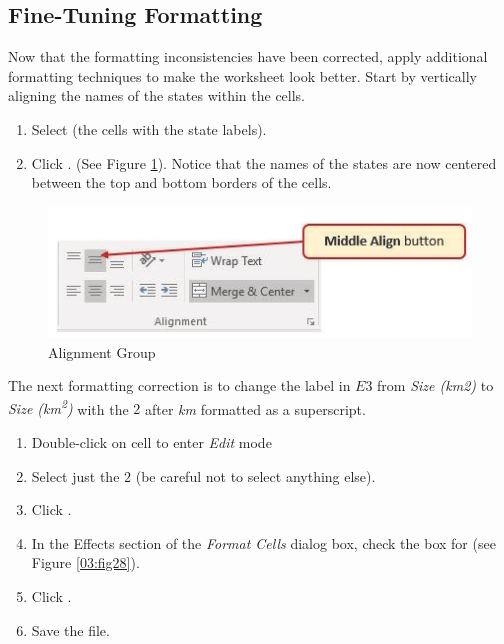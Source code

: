 \subsection{Fine-Tuning Formatting}

Now that the formatting inconsistencies have been corrected, apply additional formatting techniques to make the worksheet look better. Start by vertically aligning the names of the states within the cells.

\begin{enumerate}
	\item Select  (the cells with the state labels).
	\item Click . (See Figure \ref{03:fig27}). Notice that the names of the states are now centered between the top and bottom borders of the cells.
\end{enumerate}

\begin{figure}[H]
	\centering
	\includegraphics[width=\maxwidth{.95\linewidth}]{gfx/ch03_fig27}
	\caption{Alignment Group}
	\label{03:fig27}
\end{figure}

The next formatting correction is to change the label in $ E3 $ from \textit{Size (km2)} to \textit{Size (km\textsuperscript{2})} with the $ 2 $ after \textit{km} formatted as a superscript.

\begin{enumerate}
	\item Double-click on cell  to enter \textit{Edit} mode
	\item Select just the $ 2 $ (be careful not to select anything else).
	\item Click . 	
	\item In the Effects section of the \textit{Format Cells} dialog box, check the box for  (see Figure \ref{03:fig28}). 
	\item Click .
	\item Save the  file.
\end{enumerate}


